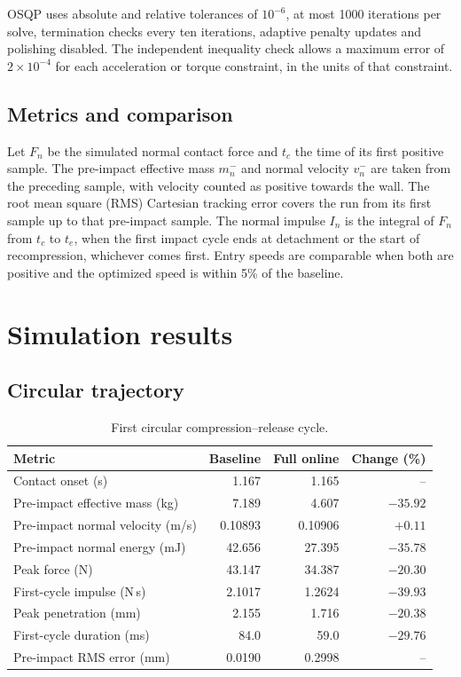\documentclass[11pt,a4paper]{article}
\newcommand{\ms}{m_n^-}
\newcommand{\vs}{v_n^-}
\begin{document}
OSQP uses absolute and relative tolerances of $10^{-6}$, at most 1000
iterations per solve, termination checks every ten iterations, adaptive
penalty updates and polishing disabled. The independent inequality check
allows a maximum error of $2\times10^{-4}$ for each acceleration or
torque constraint, in the units of that constraint.

\subsection{Metrics and comparison}
Let $F_n$ be the simulated normal contact force and $t_c$ the time of its
first positive sample. The pre-impact effective mass $\ms$ and normal
velocity $\vs$ are taken from the preceding sample, with velocity counted
as positive towards the wall. The root mean square (RMS) Cartesian tracking
error covers the run from its first sample up to that pre-impact sample.
The normal impulse $I_n$ is the integral of $F_n$ from $t_c$ to $t_e$,
when the first impact cycle ends at detachment or the start of
recompression, whichever comes first. Entry speeds are comparable when
both are positive and the optimized speed is within 5\% of the baseline.

\clearpage
\section{Simulation results}
\subsection{Circular trajectory}
\begin{table}[htbp]
\centering
\begin{tabular}{lrrr}
\toprule
Metric & Baseline & Full online & Change (\%)\\
\midrule
Contact onset (s) & 1.167 & 1.165 & --\\
Pre-impact effective mass (kg) & 7.189 & 4.607 & $-35.92$\\
Pre-impact normal velocity (m/s) & 0.10893 & 0.10906 & $+0.11$\\
Pre-impact normal energy (mJ) & 42.656 & 27.395 & $-35.78$\\
Peak force (N) & 43.147 & 34.387 & $-20.30$\\
First-cycle impulse (N\,s) & 2.1017 & 1.2624 & $-39.93$\\
Peak penetration (mm) & 2.155 & 1.716 & $-20.38$\\
First-cycle duration (ms) & 84.0 & 59.0 & $-29.76$\\
Pre-impact RMS error (mm) & 0.0190 & 0.2998 & --\\
\bottomrule
\end{tabular}
\caption{First circular compression--release cycle.}
\label{tab:circular}
\end{table}
\end{document}
